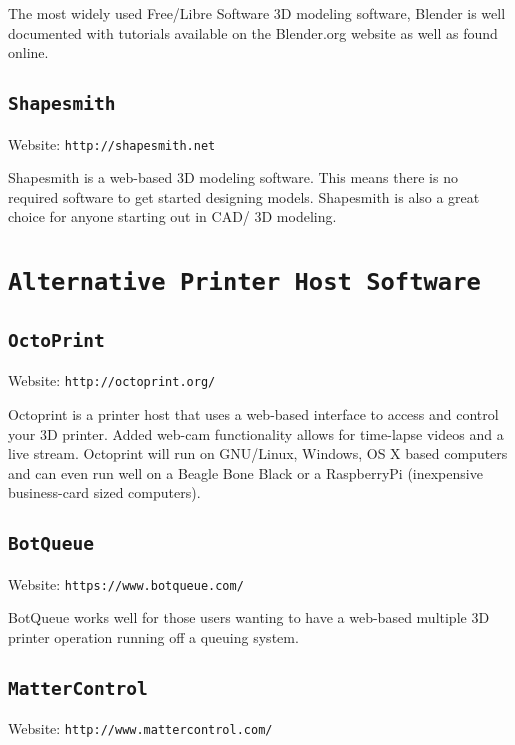 The most widely used Free/Libre Software 3D modeling software, Blender is well documented with tutorials available on the Blender.org website as well as found online.

\subsection{\texttt{Shapesmith}}
Website: \texttt{http://shapesmith.net}

Shapesmith is a web-based 3D modeling software. This means there is no required software to get started designing models. Shapesmith is also a great choice for anyone starting out in CAD/ 3D modeling.

\section{\texttt{Alternative Printer Host Software}}

\subsection{\texttt{OctoPrint}}
Website: \texttt{http://octoprint.org/}

Octoprint is a printer host that uses a web-based interface to access and control your 3D printer. Added web-cam functionality allows for time-lapse videos and a live stream. Octoprint will run on GNU/Linux, Windows, OS X based computers and can even run well on a Beagle Bone Black or a RaspberryPi (inexpensive business-card sized computers).

\subsection{\texttt{BotQueue}}
Website: \texttt{https://www.botqueue.com/}

BotQueue works well for those users wanting to have a web-based multiple 3D printer operation running off a queuing system.


\subsection{\texttt{MatterControl}}
Website: \texttt{http://www.mattercontrol.com/}

